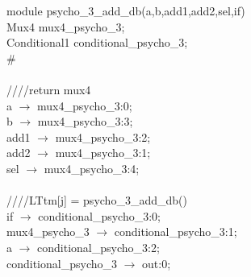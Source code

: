 module psycho\_3\_add\_db(a,b,add1,add2,sel,if){ \\
\hspace*{2em}Mux4 mux4\_psycho\_3; \\
\hspace*{2em}Conditional1 conditional\_psycho\_3; \\
\# \\
\\
\hspace*{2em}////return mux4 \\
\hspace*{2em}a $\rightarrow$ mux4\_psycho\_3:0; \\
\hspace*{2em}b $\rightarrow$ mux4\_psycho\_3:3; \\
\hspace*{2em}add1 $\rightarrow$ mux4\_psycho\_3:2; \\
\hspace*{2em} add2 $\rightarrow$ mux4\_psycho\_3:1; \\
\hspace*{2em}sel $\rightarrow$ mux4\_psycho\_3:4; \\
   \\
   \hspace*{2em}////LTtm[j] = psycho\_3\_add\_db() \\
   \hspace*{2em}if $\rightarrow$ conditional\_psycho\_3:0; \\
   \hspace*{2em}mux4\_psycho\_3 $\rightarrow$ conditional\_psycho\_3:1; \\
   \hspace*{2em}a $\rightarrow$ conditional\_psycho\_3:2; \\
   \hspace*{2em}conditional\_psycho\_3 $\rightarrow$ out:0; \\
} \\
\\
\\
